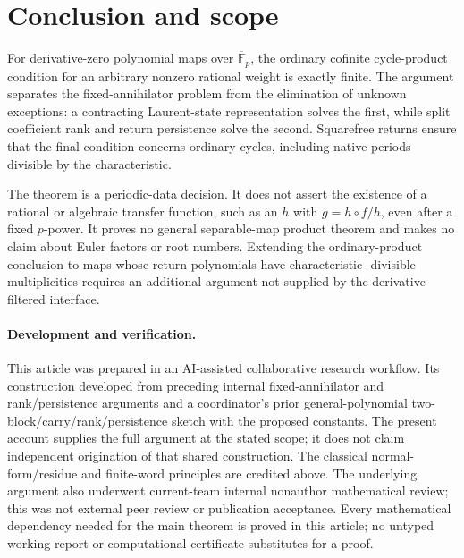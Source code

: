 \section{Conclusion and scope}

For derivative-zero polynomial maps over $\overline{\mathbb F}_p$,
the ordinary cofinite cycle-product condition for an arbitrary
nonzero rational weight is exactly finite. The argument separates
the fixed-annihilator problem from the elimination of unknown
exceptions: a contracting Laurent-state representation solves the
first, while split coefficient rank and return persistence solve
the second. Squarefree returns ensure that the final condition
concerns ordinary cycles, including native periods divisible by
the characteristic.

The theorem is a periodic-data decision. It does not assert the
existence of a rational or algebraic transfer function, such as an
$h$ with $g=h\circ f/h$, even after a fixed $p$-power. It proves
no general separable-map product theorem and makes no claim about
Euler factors or root numbers. Extending the ordinary-product
conclusion to maps whose return polynomials have characteristic-
divisible multiplicities requires an additional argument not
supplied by the derivative-filtered interface.

\paragraph{Development and verification.}
This article was prepared in an AI-assisted collaborative research
workflow. Its construction developed from preceding internal
fixed-annihilator and rank/persistence arguments and a coordinator's
prior general-polynomial two-block/carry/rank/persistence sketch
with the proposed constants. The present account supplies the full
argument at the stated scope; it does not claim independent
origination of that shared construction. The classical
normal-form/residue and finite-word principles are credited above.
The underlying argument also underwent current-team internal
nonauthor mathematical review; this was not external peer review
or publication acceptance.
Every mathematical dependency needed for the main theorem is
proved in this article; no untyped working report or computational
certificate substitutes for a proof.
